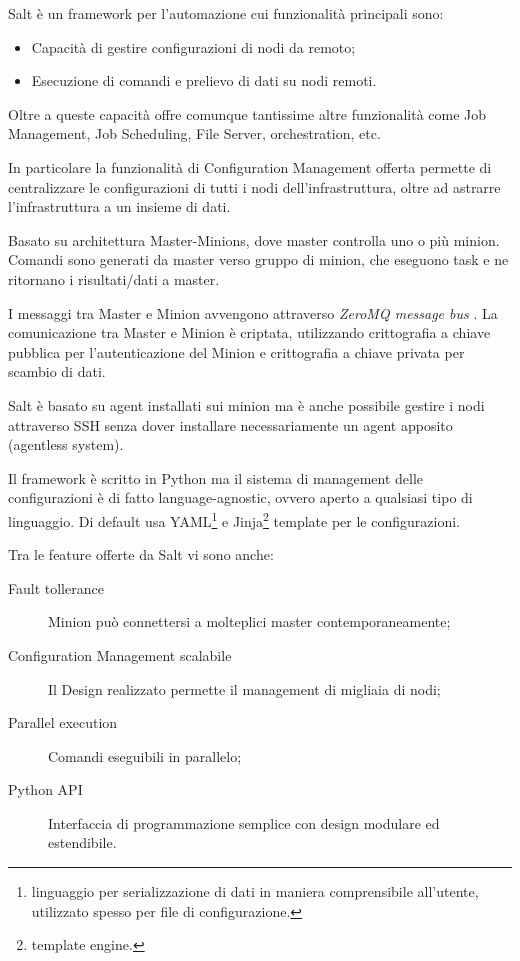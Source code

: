 Salt è un framework per l'automazione cui funzionalità principali sono:
\begin{itemize}
    \item Capacità di gestire configurazioni di nodi da remoto;
    \item Esecuzione di comandi  e prelievo di dati su nodi remoti.
\end{itemize}

Oltre a queste capacità offre comunque tantissime altre funzionalità come Job Management, Job Scheduling, File Server, orchestration, etc.


In particolare la funzionalità di Configuration Management offerta permette di centralizzare le configurazioni di tutti i nodi dell'infrastruttura, oltre ad astrarre l'infrastruttura a un insieme di dati.

Basato su architettura Master-Minions, dove master controlla uno o più minion. Comandi sono generati da master verso gruppo di minion, che eseguono task e ne ritornano i risultati/dati a master.

I messaggi tra Master e Minion avvengono attraverso \textit{ZeroMQ message bus} \cite{zeromq}. La comunicazione tra Master e Minion è criptata, utilizzando crittografia a chiave pubblica per l'autenticazione del Minion e  crittografia a chiave privata per scambio di dati.

Salt è basato su agent installati sui  minion ma è anche possibile gestire i nodi attraverso SSH senza dover installare necessariamente un agent apposito (agentless system).

Il framework è scritto in Python ma il sistema di management delle configurazioni è di fatto language-agnostic, ovvero aperto a qualsiasi tipo di linguaggio.
Di default usa YAML\footnote{linguaggio per serializzazione di dati in maniera comprensibile all'utente, utilizzato spesso per file di configurazione.}   \cite{yaml} e Jinja\footnote{template engine.} \cite{jinja} template per le configurazioni.

Tra le feature offerte da Salt vi sono anche:
\begin{description}
    \item[Fault tollerance]  Minion può connettersi a molteplici master contemporaneamente;
    \item[Configuration Management scalabile] Il Design realizzato permette il management di migliaia di nodi;
    \item[Parallel execution] Comandi eseguibili in parallelo;
    \item[Python API] Interfaccia di programmazione semplice con design modulare ed estendibile.
\end{description}



